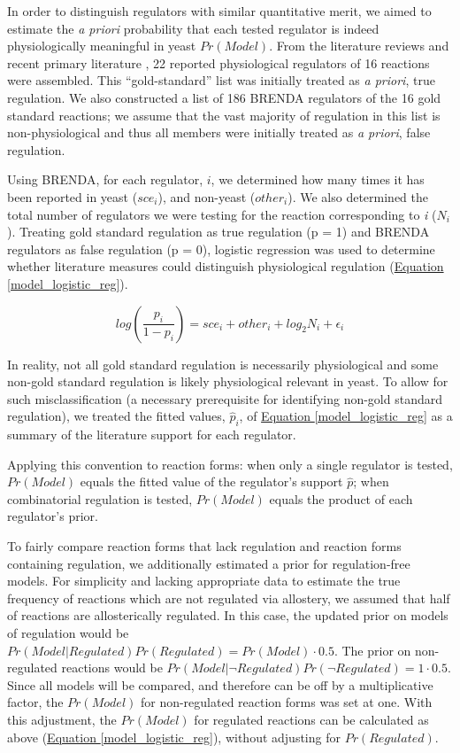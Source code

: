 In order to distinguish regulators with similar quantitative merit, we aimed to estimate the \textit{a priori} probability that each tested regulator is indeed physiologically meaningful in yeast $Pr(Model)$. From the literature reviews and recent primary literature \cite{Jones:1982dn, Sekine:2007ej, Fraenkel:2011wp}, 22 reported physiological regulators of 16 reactions were assembled. This ``gold-standard'' list was initially treated as \textit{a priori}, true regulation. We also constructed a list of 186 BRENDA regulators of the 16 gold standard reactions; we assume that the vast majority of regulation in this list is non-physiological and thus all members were initially treated as \textit{a priori}, false regulation. 

Using BRENDA, for each regulator, $\textit{i}$, we determined how many times it has been reported in yeast ($sce_{i}$), and non-yeast ($other_{i}$). We also determined the total number of regulators we were testing for the reaction corresponding to \textit{i} ($N_{i}$). Treating gold standard regulation as true regulation (p = 1) and BRENDA regulators as false regulation (p = 0), logistic regression was used to determine whether literature measures could distinguish physiological regulation (\hyperref[model_logistic_reg]{Equation \ref{model_logistic_reg}}).

\begin{equation}
log\left(\frac{p_{i}}{{1-p_{i}}}\right) = sce_{i} + other_{i} + log_{2}N_{i} + \epsilon_{i}\label{model_logistic_reg}
\end{equation}

In reality, not all gold standard regulation is necessarily physiological and some non-gold standard regulation is likely physiological relevant in yeast. To allow for such misclassification (a necessary prerequisite for identifying non-gold standard regulation), we treated the fitted values, $\hat{p}_{i}$, of \hyperref[model_logistic_reg]{Equation \ref{model_logistic_reg}} as a summary of the literature support for each regulator.

Applying this convention to reaction forms: when only a single regulator is tested, $Pr(Model)$ equals the fitted value of the regulator's support $\hat{p}$; when combinatorial regulation is tested, $Pr(Model)$ equals the product of each regulator's prior.

To fairly compare reaction forms that lack regulation and reaction forms containing regulation, we additionally estimated a prior for regulation-free models. For simplicity and lacking appropriate data to estimate the true frequency of reactions which are not regulated via allostery, we assumed that half of reactions are allosterically regulated. In this case, the updated prior on models of regulation would be $Pr(Model | Regulated) Pr(Regulated) = Pr(Model) \cdot 0.5$. The prior on non-regulated reactions would be $Pr(Model | \neg Regulated) Pr(\neg Regulated) = 1 \cdot 0.5$. Since all models will be compared, and therefore can be off by a multiplicative factor, the $Pr(Model)$ for non-regulated reaction forms was set at one. With this adjustment, the $Pr(Model)$ for regulated reactions can be calculated as above (\hyperref[model_logistic_reg]{Equation \ref{model_logistic_reg}}), without adjusting for $Pr(Regulated)$.

